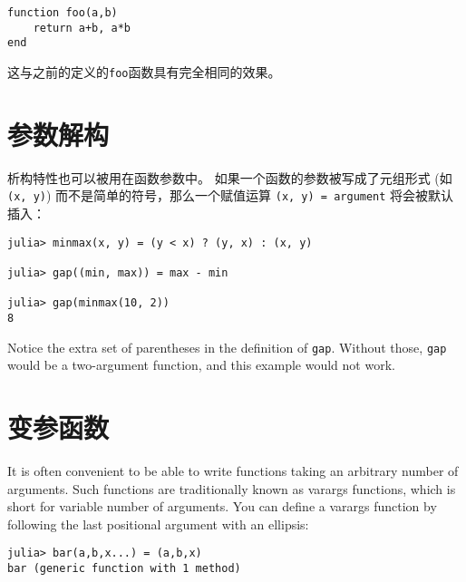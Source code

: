 \begin{verbatim}
function foo(a,b)
    return a+b, a*b
end
\end{verbatim}



这与之前的定义的\texttt{foo}函数具有完全相同的效果。



\hypertarget{13913778167558632631}{}


\section{参数解构}



析构特性也可以被用在函数参数中。 如果一个函数的参数被写成了元组形式 (如  \texttt{(x, y)}) 而不是简单的符号，那么一个赋值运算 \texttt{(x, y) = argument} 将会被默认插入：




\begin{verbatim}
julia> minmax(x, y) = (y < x) ? (y, x) : (x, y)

julia> gap((min, max)) = max - min

julia> gap(minmax(10, 2))
8
\end{verbatim}



Notice the extra set of parentheses in the definition of \texttt{gap}. Without those, \texttt{gap} would be a two-argument function, and this example would not work.



\hypertarget{2609189760420802889}{}


\section{变参函数}



It is often convenient to be able to write functions taking an arbitrary number of arguments. Such functions are traditionally known as {\textquotedbl}varargs{\textquotedbl} functions, which is short for {\textquotedbl}variable number of arguments{\textquotedbl}. You can define a varargs function by following the last positional argument with an ellipsis:




\begin{verbatim}
julia> bar(a,b,x...) = (a,b,x)
bar (generic function with 1 method)
\end{verbatim}



